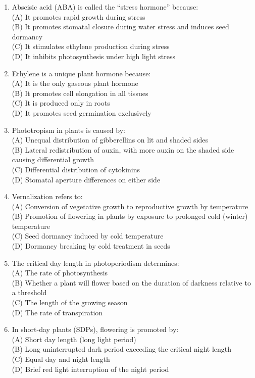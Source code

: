 \documentclass{article}
\begin{document}
\begin{enumerate}[label=Q\arabic*.]
\item Abscisic acid (ABA) is called the ``stress hormone'' because:
\\(A) It promotes rapid growth during stress
\\(B) It promotes stomatal closure during water stress and induces seed dormancy
\\(C) It stimulates ethylene production during stress
\\(D) It inhibits photosynthesis under high light stress

\item Ethylene is a unique plant hormone because:
\\(A) It is the only gaseous plant hormone
\\(B) It promotes cell elongation in all tissues
\\(C) It is produced only in roots
\\(D) It promotes seed germination exclusively

\item Phototropism in plants is caused by:
\\(A) Unequal distribution of gibberellins on lit and shaded sides
\\(B) Lateral redistribution of auxin, with more auxin on the shaded side causing differential growth
\\(C) Differential distribution of cytokinins
\\(D) Stomatal aperture differences on either side

\item Vernalization refers to:
\\(A) Conversion of vegetative growth to reproductive growth by temperature
\\(B) Promotion of flowering in plants by exposure to prolonged cold (winter) temperature
\\(C) Seed dormancy induced by cold temperature
\\(D) Dormancy breaking by cold treatment in seeds

\item The critical day length in photoperiodism determines:
\\(A) The rate of photosynthesis
\\(B) Whether a plant will flower based on the duration of darkness relative to a threshold
\\(C) The length of the growing season
\\(D) The rate of transpiration

\item In short-day plants (SDPs), flowering is promoted by:
\\(A) Short day length (long light period)
\\(B) Long uninterrupted dark period exceeding the critical night length
\\(C) Equal day and night length
\\(D) Brief red light interruption of the night period


\end{enumerate}
\end{document}
